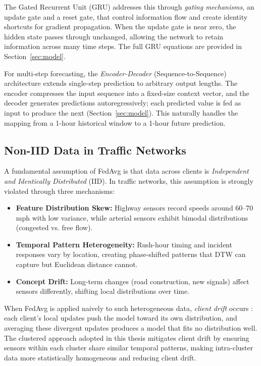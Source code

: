 The Gated Recurrent Unit (GRU) \cite{cho2014} addresses this through \textit{gating mechanisms}, an update gate and a reset gate, that control information flow and create identity shortcuts for gradient propagation. When the update gate is near zero, the hidden state passes through unchanged, allowing the network to retain information across many time steps. The full GRU equations are provided in Section~\ref{sec:model}.

For multi-step forecasting, the \textit{Encoder-Decoder} (Sequence-to-Sequence) architecture \cite{cho2014} extends single-step prediction to arbitrary output lengths. The encoder compresses the input sequence into a fixed-size context vector, and the decoder generates predictions autoregressively; each predicted value is fed as input to produce the next (Section~\ref{sec:model}). This naturally handles the mapping from a 1-hour historical window to a 1-hour future prediction.

\subsection{Non-IID Data in Traffic Networks}
\label{sec:noniid_theory}

A fundamental assumption of FedAvg is that data across clients is \textit{Independent and Identically Distributed} (IID). In traffic networks, this assumption is strongly violated through three mechanisms:

\begin{itemize}
    \item \textbf{Feature Distribution Skew:} Highway sensors record speeds around 60--70 mph with low variance, while arterial sensors exhibit bimodal distributions (congested vs. free flow).
    \item \textbf{Temporal Pattern Heterogeneity:} Rush-hour timing and incident responses vary by location, creating phase-shifted patterns that DTW can capture but Euclidean distance cannot.
    \item \textbf{Concept Drift:} Long-term changes (road construction, new signals) affect sensors differently, shifting local distributions over time.
\end{itemize}

When FedAvg is applied naively to such heterogeneous data, \textit{client drift} occurs \cite{zhao2018, karimireddy2020}: each client's local updates push the model toward its own distribution, and averaging these divergent updates produces a model that fits no distribution well. The clustered approach adopted in this thesis mitigates client drift by ensuring sensors within each cluster share similar temporal patterns, making intra-cluster data more statistically homogeneous and reducing client drift.

